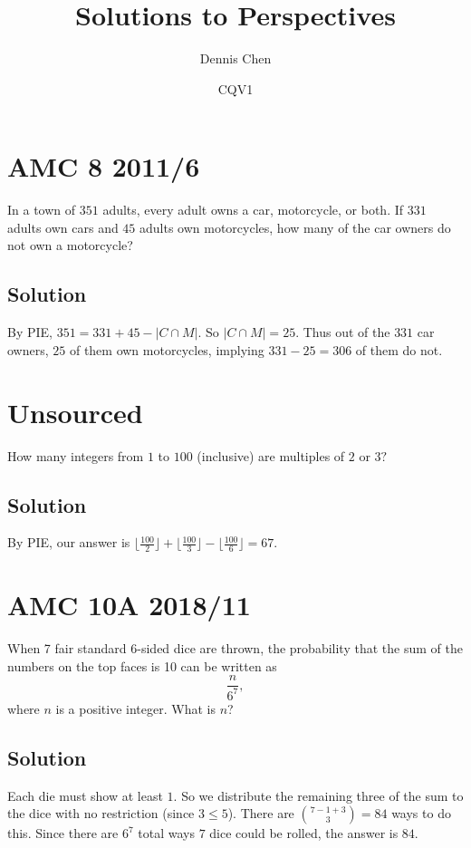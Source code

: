 \documentclass{article}
\title{Solutions to Perspectives}
\author{Dennis Chen}
\date{CQV1}
\begin{document}
\maketitle

\toc

\pagebreak\section{AMC 8 2011/6}
In a town of $351$ adults, every adult owns a car, motorcycle, or both. If $331$ adults own cars and $45$ adults own motorcycles, how many of the car owners do not own a motorcycle?

\subsection{Solution}
By PIE, $351=331+45-|C \cap M|.$ So $|C\cap M|=25.$ Thus out of the $331$ car owners, $25$ of them own motorcycles, implying $331-25=306$ of them do not.

\pagebreak\section{Unsourced}
How many integers from $1$ to $100$ (inclusive) are multiples of $2$ or $3?$

\subsection{Solution}
By PIE, our answer is $\lfloor\frac{100}{2}\rfloor+\lfloor\frac{100}{3}\rfloor-\lfloor\frac{100}{6}\rfloor=67.$

\pagebreak\section{AMC 10A 2018/11}
When 7 fair standard 6-sided dice are thrown, the probability that the sum of the numbers on the top faces is 10 can be written as\[\frac{n}{6^7},\]where $n$ is a positive integer. What is $n$?

\subsection{Solution}
Each die must show at least $1.$ So we distribute the remaining three of the sum to the dice with no restriction (since $3\leq 5$). There are $\binom{7-1+3}{3}=84$ ways to do this. Since there are $6^7$ total ways $7$ dice could be rolled, the answer is $84.$
\end{document}
